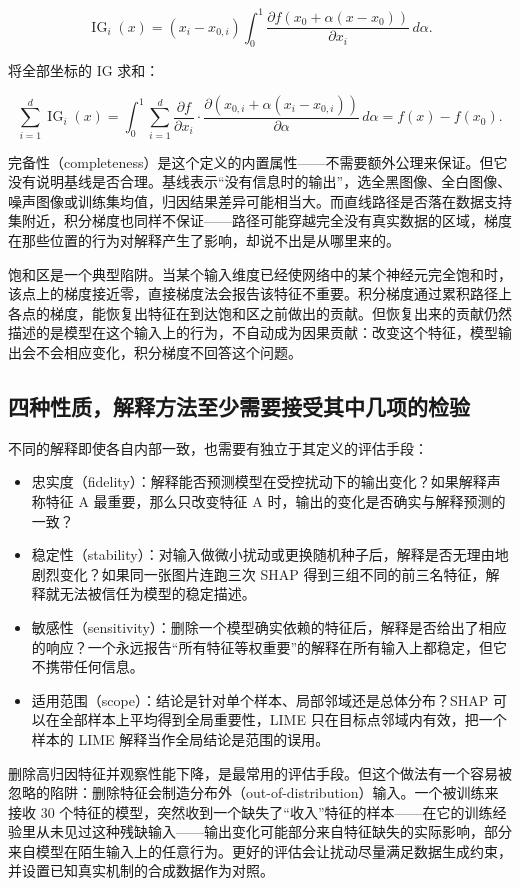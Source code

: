 \[
\operatorname{IG}_i(x)
= (x_i - x_{0,i})
\int_0^1
\frac{\partial f(x_0 + \alpha(x - x_0))}{\partial x_i}
\,d\alpha.
\]

将全部坐标的 IG 求和：

\[
\sum_{i=1}^d \operatorname{IG}_i(x)
= \int_0^1 \sum_{i=1}^d
\frac{\partial f}{\partial x_i}
\cdot \frac{\partial (x_{0,i} + \alpha(x_i - x_{0,i}))}{\partial \alpha}
\,d\alpha
= f(x) - f(x_0).
\]

完备性（completeness）是这个定义的内置属性——不需要额外公理来保证。但它没有说明基线是否合理。基线表示``没有信息时的输出''，选全黑图像、全白图像、噪声图像或训练集均值，归因结果差异可能相当大。而直线路径是否落在数据支持集附近，积分梯度也同样不保证——路径可能穿越完全没有真实数据的区域，梯度在那些位置的行为对解释产生了影响，却说不出是从哪里来的。

饱和区是一个典型陷阱。当某个输入维度已经使网络中的某个神经元完全饱和时，该点上的梯度接近零，直接梯度法会报告该特征不重要。积分梯度通过累积路径上各点的梯度，能恢复出特征在到达饱和区之前做出的贡献。但恢复出来的贡献仍然描述的是模型在这个输入上的行为，不自动成为因果贡献：改变这个特征，模型输出会不会相应变化，积分梯度不回答这个问题。

\subsection{四种性质，解释方法至少需要接受其中几项的检验}

不同的解释即使各自内部一致，也需要有独立于其定义的评估手段：

\begin{itemize}
\tightlist
\item
  忠实度（fidelity）：解释能否预测模型在受控扰动下的输出变化？如果解释声称特征 A 最重要，那么只改变特征 A 时，输出的变化是否确实与解释预测的一致？
\item
  稳定性（stability）：对输入做微小扰动或更换随机种子后，解释是否无理由地剧烈变化？如果同一张图片连跑三次 SHAP 得到三组不同的前三名特征，解释就无法被信任为模型的稳定描述。
\item
  敏感性（sensitivity）：删除一个模型确实依赖的特征后，解释是否给出了相应的响应？一个永远报告``所有特征等权重要''的解释在所有输入上都稳定，但它不携带任何信息。
\item
  适用范围（scope）：结论是针对单个样本、局部邻域还是总体分布？SHAP 可以在全部样本上平均得到全局重要性，LIME 只在目标点邻域内有效，把一个样本的 LIME 解释当作全局结论是范围的误用。
\end{itemize}

删除高归因特征并观察性能下降，是最常用的评估手段。但这个做法有一个容易被忽略的陷阱：删除特征会制造分布外（out-of-distribution）输入。一个被训练来接收 30 个特征的模型，突然收到一个缺失了``收入''特征的样本——在它的训练经验里从未见过这种残缺输入——输出变化可能部分来自特征缺失的实际影响，部分来自模型在陌生输入上的任意行为。更好的评估会让扰动尽量满足数据生成约束，并设置已知真实机制的合成数据作为对照。

